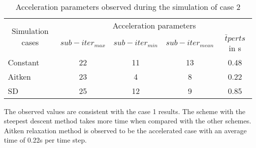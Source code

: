 \begin{table}[htbp]
  \centering
   \begin{tabular}{|l|c|c|c|c|}
    \hline
    \multicolumn{1}{|c|}{\multirow{2}[4]{*}{Simulation cases}} & \multicolumn{4}{c|}{Acceleration parameters} \\
\cline{2-5}          & ${sub-iter}_{max}$ & ${sub-iter}_{min}$ & ${sub-iter}_{mean}$ & ${\bar{t}} per ts$ in s \\
    \hline
    Constant & 22    & 11    & 13    & 0.48 \\
    \hline
    Aitken & 23    & 4     & 8     & 0.22 \\
    \hline
    SD    & 25    & 12    & 9     & 0.85 \\
    \hline
    \end{tabular}%
   \caption{Acceleration parameters observed during the simulation of case 2}
  \label{table:4.12}%
\end{table}%

The observed values are consistent with the case 1 results. The scheme with the steepest descent method takes more time when compared with the other schemes. Aitken relaxation method is observed to be the accelerated case with an average time of 0.22s per time step. 